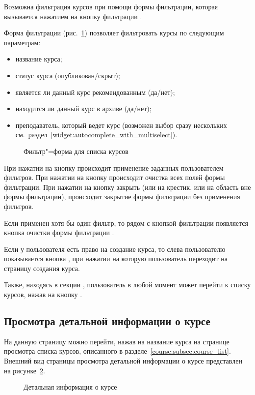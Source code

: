 Возможна фильтрация курсов при помощи формы фильтрации, которая вызывается нажатием на кнопку фильтрации .

Форма фильтрации (рис.~\ref{img:course:course_filter_form}) позволяет фильтровать курсы по следующим параметрам:
\begin{itemize}
	\item название курса;
	\item статус курса (опубликован/скрыт);
	\item является ли данный курс рекомендованным (да/нет);
	\item находится ли данный курс в архиве (да/нет);
	\item преподаватель, который ведет курс (возможен выбор сразу нескольких см.\ раздел~\ref{widget:autocomplete_with_multiselect}).
\end{itemize}

\begin{figure}[H]
	\caption{Фильтр"=форма для списка курсов}
	\label{img:course:course_filter_form}
\end{figure}

При нажатии на кнопку  происходит применение заданных пользователем фильтров. При нажатии на кнопку  происходит очистка всех полей формы фильтрации. При нажатии на кнопку закрыть (или на крестик, или на область вне формы фильтрации), происходит закрытие формы фильтрации без применения фильтров.

Если применен хотя бы один фильтр, то рядом с кнопкой фильтрации появляется кнопка очистки формы фильтрации .

Если у пользователя есть право на создание курса, то слева пользователю показывается кнопка
, при нажатии на которую пользователь переходит на страницу создания курса.

Также, находясь в секции , пользователь в любой момент может перейти к списку курсов, нажав на кнопку .

\subsection{Просмотра детальной информации о курсе}
\label{course:subsec:course_detail}
На данную страницу можно перейти, нажав на название курса на странице просмотра списка курсов, описанного в разделе~\ref{course:subsec:course_list}. Внешний вид страницы просмотра детальной информации о курсе представлен на рисунке~\ref{img:course:course_detail}.
\begin{figure}[H]
	\caption{Детальная информация о курсе}
	\label{img:course:course_detail}
\end{figure}

